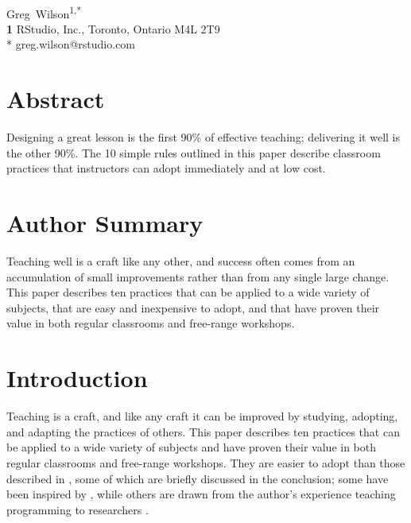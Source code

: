 \documentclass[10pt,letterpaper]{article}
\begin{document}
\vspace*{0.2in}

\begin{flushleft}
{\Large
\textbf{}
}
\newline
\\
{Greg~Wilson}\textsuperscript{1,*}
\\
\textbf{1} RStudio, Inc., Toronto, Ontario M4L 2T9
\\
\bigskip
* greg.wilson@rstudio.com
\end{flushleft}

\section*{Abstract}

Designing a great lesson is the first 90\% of effective teaching;
delivering it well is the other 90\%.
The 10 simple rules outlined in this paper
describe classroom practices that instructors can adopt immediately and at low cost.

\section*{Author Summary}

Teaching well is a craft like any other,
and success often comes from an accumulation of small improvements
rather than from any single large change.
This paper describes ten practices that can be applied to a wide variety of subjects,
that are easy and inexpensive to adopt,
and that have proven their value in both regular classrooms and free-range workshops.

\section*{Introduction}

Teaching is a craft,
and like any craft it can be improved by studying, adopting, and adapting
the practices of others.
This paper describes ten practices that can be applied to a wide variety of subjects
and have proven their value in both regular classrooms and free-range workshops.
They are easier to adopt than those described in \cite{Brow2018,Deve2018},
some of which are briefly discussed in the conclusion;
some have been inspired by \cite{Hust2012,Lang2016,Lemo2014},
while others are drawn from the author's experience
teaching programming to researchers \cite{Wils2016}.
\end{document}
